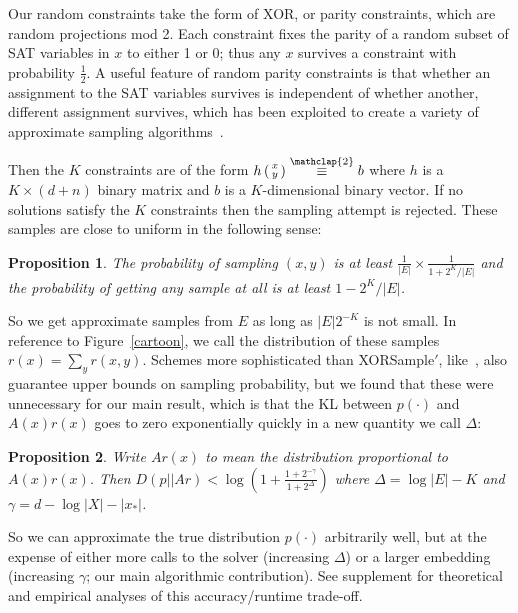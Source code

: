 \documentclass{article}
\newtheorem{proposition}{Proposition}
\newcommand\modt{\stackrel{\mathclap{\normalfont 2}}{\equiv}}
\begin{document}
  Our random constraints take the form of XOR, or parity constraints, which are random projections mod 2.
  Each constraint fixes the parity of a random subset of SAT variables in $x$ to either 1 or 0;
  thus any $x$ survives a constraint with probability $\frac{1}{2}$.
  A useful feature of random parity constraints is that whether an assignment to the SAT variables survives is independent of whether another, different assignment survives, which has been exploited to create a variety of approximate sampling algorithms~\cite{gomes2006near,valiant1985np,AAAI148364,gomes2006model,chakraborty2013scalable}.
  
  Then the $K$ constraints are of the form $h\left(\begin{smallmatrix}x\\y\end{smallmatrix}\right) \modt b$ where $h$ is a $K\times (d+n)$ binary matrix and $b$ is a $K$-dimensional binary vector.
  If no solutions satisfy the $K$ constraints then the sampling attempt is rejected.
  These samples are close to uniform in the following sense:%
  \begin{proposition}\label{propositionLowerBound} 
    The probability of sampling $(x,y)$ is at least $\frac{1}{|E|}\times \frac{1}{1 + 2^K/|E|}$ and the probability of getting any sample at all is at least $1 - 2^{K}/|E|$.
  \end{proposition}

  So we get approximate samples from $E$ as long as $|E|2^{-K}$ is not small.
  In reference to Figure~\ref{cartoon},
  we call the distribution of these samples $r(x)=\sum_y r(x,y)$.
  Schemes more sophisticated than XORSample$'$, like~\cite{ermon2013embed}, also guarantee upper bounds on sampling probability, but we found that these were unnecessary for our main result, which is that the KL between $p(\cdot )$ and $A(x)r(x)$ goes to zero exponentially quickly in a new quantity we call $\Delta$:
  \begin{proposition}\label{mainResult}
    Write $Ar(x)$ to mean the distribution  proportional to $A(x)r(x)$. Then $D(p||Ar)<\log \left( 1 + \frac{1 + 2^{ - \gamma}}{1 + 2^\Delta}\right)$ where
    $\Delta = \log |E| - K$ and $\gamma = d - \log |X| - \lvert x_* \rvert $.
  \end{proposition}

  So we can approximate the true distribution $p(\cdot )$ arbitrarily well, but at the expense of either more calls to the solver (increasing $\Delta$) or a larger embedding (increasing $\gamma$; our main algorithmic contribution).
  See supplement for theoretical and empirical analyses of this accuracy/runtime trade-off.
  
\end{document}
